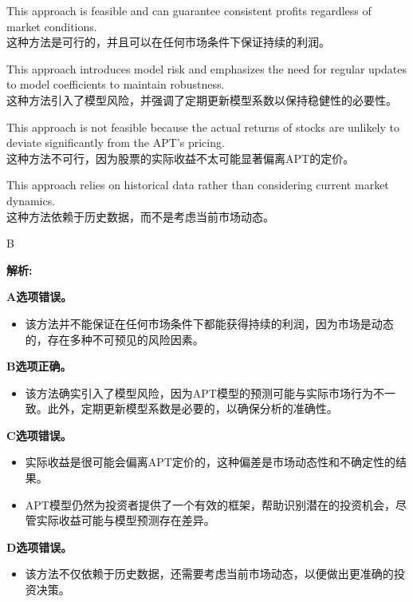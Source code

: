 \documentclass{article}
\newenvironment{explanation}
{\textbf{解析:}\par}
{\par}
\begin{document}
\begin{choices}
    \item This approach is feasible and can guarantee consistent profits regardless of market conditions.
    \\
    这种方法是可行的，并且可以在任何市场条件下保证持续的利润。
    \item This approach introduces model risk and emphasizes the need for regular updates to model coefficients to maintain robustness.
    \\
    这种方法引入了模型风险，并强调了定期更新模型系数以保持稳健性的必要性。
    \item This approach is not feasible because the actual returns of stocks are unlikely to deviate significantly from the APT's pricing.
    \\
    这种方法不可行，因为股票的实际收益不太可能显著偏离APT的定价。
    \item This approach relies on historical data rather than considering current market dynamics.
    \\
    这种方法依赖于历史数据，而不是考虑当前市场动态。
\end{choices}

\begin{correctanswer}
    B
\end{correctanswer}

\begin{explanation}
    \textbf{A选项错误。}
    \begin{itemize}
        \item 该方法并不能保证在任何市场条件下都能获得持续的利润，因为市场是动态的，存在多种不可预见的风险因素。
    \end{itemize}
    
    \textbf{B选项正确。}
    \begin{itemize}
        \item 该方法确实引入了模型风险，因为APT模型的预测可能与实际市场行为不一致。此外，定期更新模型系数是必要的，以确保分析的准确性。
    \end{itemize}
    
    \textbf{C选项错误。}
    \begin{itemize}
        \item 实际收益是很可能会偏离APT定价的，这种偏差是市场动态性和不确定性的结果。
        \item APT模型仍然为投资者提供了一个有效的框架，帮助识别潜在的投资机会，尽管实际收益可能与模型预测存在差异。
    \end{itemize}
    
    \textbf{D选项错误。}
    \begin{itemize}
        \item 该方法不仅依赖于历史数据，还需要考虑当前市场动态，以便做出更准确的投资决策。
    \end{itemize}
\end{explanation}
\end{document}
